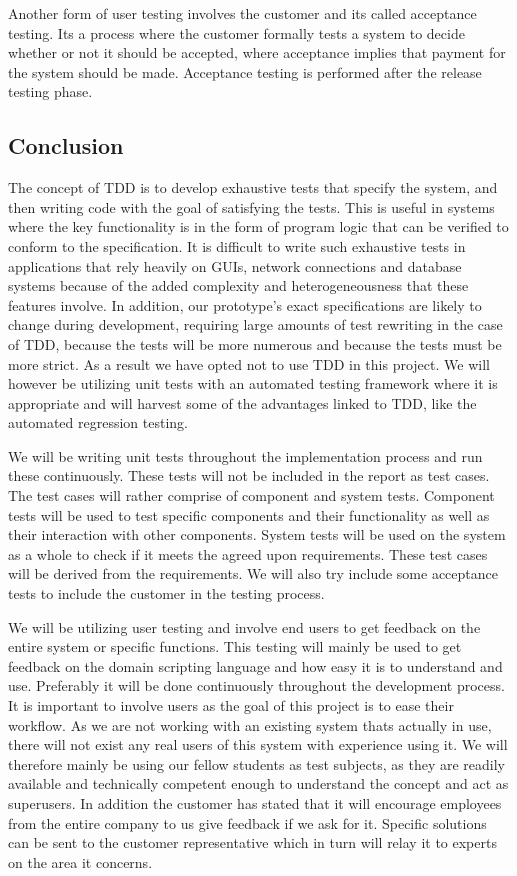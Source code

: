 Another form of user testing involves the customer and its called acceptance testing. Its a process where the customer formally tests a system to decide whether or not it should be accepted, where acceptance implies that payment for the system should be made. Acceptance testing is performed after the release testing phase.

\subsection{Conclusion}
The concept of TDD is to develop exhaustive tests that specify the system, and then writing code with the goal of satisfying the tests. This is useful in systems where the key functionality is in the form of program logic that can be verified to conform to the specification. It is difficult to write such exhaustive tests in applications that rely heavily on GUIs, network connections and database systems because of the added complexity and heterogeneousness that these features involve. In addition, our prototype's exact specifications are likely to change during development, requiring large amounts of test rewriting in the case of TDD, because the tests will be more numerous and because the tests must be more strict. As a result we have opted not to use TDD in this project. We will however be utilizing unit tests with an automated testing framework where it is appropriate and will harvest some of the advantages linked to TDD, like the automated regression testing.

We will be writing unit tests throughout the implementation process and run these continuously. These tests will not be included in the report as test cases. The test cases will rather comprise of component and system tests. Component tests will be used to test specific components and their functionality as well as their interaction with other components. System tests will be used on the system as a whole to check if it meets the agreed upon requirements. These test cases will be derived from the requirements. We will also try include some acceptance tests to include the customer in the testing process.

We will be utilizing user testing and involve end users to get feedback on the entire system or specific functions. This testing will mainly be used to get feedback on the domain scripting language and how easy it is to understand and use. Preferably it will be done continuously throughout the development process. It is important to involve users as the goal of this project is to ease their workflow. As we are not working with an existing system thats actually in use, there will not exist any real users of this system with experience using it. We will therefore mainly be using our fellow students as test subjects, as they are readily available and technically competent enough to understand the concept and act as superusers. In addition the customer has stated that it will encourage employees from the entire company to us give feedback if we ask for it. Specific solutions can be sent to the customer representative which in turn will relay it to experts on the area it concerns.


